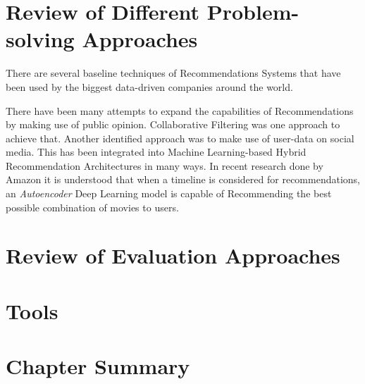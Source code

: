 



\section{Review of Different Problem-solving Approaches}
There are several baseline techniques of Recommendations Systems that have been used by the biggest data-driven companies around the world.


\bigbreak
\autocite{larry_history_2019}
There have been many attempts to expand the capabilities of Recommendations by making use of public opinion. Collaborative Filtering was one approach to achieve that. Another identified approach was to make use of user-data on social media. This has been integrated into Machine Learning-based Hybrid Recommendation Architectures in many ways. In recent research done by Amazon \autocite{larry_history_2019} it is understood that when a timeline is considered for recommendations, an \emph{Autoencoder} Deep Learning model is capable of Recommending the best possible combination of movies to users.




\section{Review of Evaluation Approaches}

\section{Tools}

\section{Chapter Summary}
